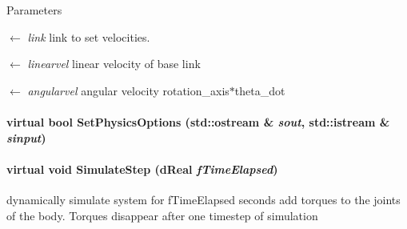 \begin{DoxyParams}{Parameters}
\item[\mbox{$\leftarrow$} {\em link}]link to set velocities. \item[\mbox{$\leftarrow$} {\em linearvel}]linear velocity of base link \item[\mbox{$\leftarrow$} {\em angularvel}]angular velocity rotation\_\-axis$\ast$theta\_\-dot \end{DoxyParams}
\hypertarget{classOpenRAVE_1_1PhysicsEngineBase_a7cc87335dc1afb1ab99e53b7a4a70ac7}{
\paragraph[{SetPhysicsOptions}]{\setlength{\rightskip}{0pt plus 5cm}virtual bool SetPhysicsOptions (std::ostream \& {\em sout}, \/  std::istream \& {\em sinput})}\hfill}
\label{classOpenRAVE_1_1PhysicsEngineBase_a7cc87335dc1afb1ab99e53b7a4a70ac7}
\hypertarget{classOpenRAVE_1_1PhysicsEngineBase_ad060957d4850f20600b9d99732912fef}{
\paragraph[{SimulateStep}]{\setlength{\rightskip}{0pt plus 5cm}virtual void SimulateStep (dReal {\em fTimeElapsed})}\hfill}
\label{classOpenRAVE_1_1PhysicsEngineBase_ad060957d4850f20600b9d99732912fef}
dynamically simulate system for fTimeElapsed seconds add torques to the joints of the body. Torques disappear after one timestep of simulation 